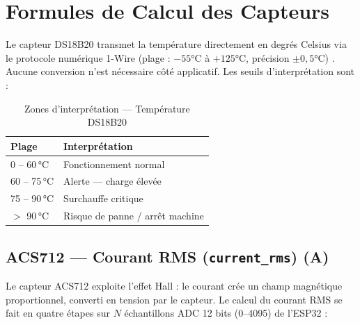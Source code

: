 \documentclass[12pt, a4paper, oneside]{report}
\begin{document}
\section{Formules de Calcul des Capteurs}

Le capteur DS18B20 transmet la température directement en degrés Celsius via le protocole
numérique 1-Wire (plage : $-55$°C à $+125$°C, précision $\pm 0{,}5$°C) \cite{ds18b20}. Aucune conversion
n'est nécessaire côté applicatif. Les seuils d'interprétation sont :

\begin{table}[H]
  \centering
  \begin{tabularx}{\textwidth}{C{3cm} L{8cm}}
    \toprule
    \textbf{Plage} & \textbf{Interprétation} \\
    \midrule
           0 -- 60\,°C   & Fonctionnement normal \\
    60 -- 75\,°C  & Alerte — charge élevée \\
           75 -- 90\,°C  & Surchauffe critique \\
    $>$ 90\,°C   & Risque de panne / arrêt machine \\
    \bottomrule
  \end{tabularx}
  \caption{Zones d'interprétation — Température DS18B20}
\end{table}

\subsection{ACS712 — Courant RMS (\texttt{current\_rms}) (A)}

Le capteur ACS712 exploite l'effet Hall : le courant crée un champ magnétique proportionnel,
converti en tension par le capteur. Le calcul du courant RMS se fait en quatre étapes sur
$N$ échantillons ADC 12 bits (0--4095) de l'ESP32 :
\end{document}
